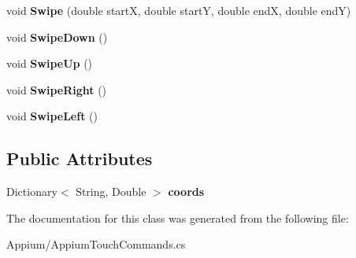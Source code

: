 \begin{DoxyCompactItemize}
\item 
\hypertarget{class_proto_test_1_1_golem_1_1_appium_1_1_appium_touch_commands_af433db53b97305c8228e1ce954869a0b}{void {\bfseries Swipe} (double start\-X, double start\-Y, double end\-X, double end\-Y)}\label{class_proto_test_1_1_golem_1_1_appium_1_1_appium_touch_commands_af433db53b97305c8228e1ce954869a0b}

\item 
\hypertarget{class_proto_test_1_1_golem_1_1_appium_1_1_appium_touch_commands_a748084cceb4117de257a71d1542d2eb1}{void {\bfseries Swipe\-Down} ()}\label{class_proto_test_1_1_golem_1_1_appium_1_1_appium_touch_commands_a748084cceb4117de257a71d1542d2eb1}

\item 
\hypertarget{class_proto_test_1_1_golem_1_1_appium_1_1_appium_touch_commands_af7cee2e3d005ea1cf9c3ba0f4e397775}{void {\bfseries Swipe\-Up} ()}\label{class_proto_test_1_1_golem_1_1_appium_1_1_appium_touch_commands_af7cee2e3d005ea1cf9c3ba0f4e397775}

\item 
\hypertarget{class_proto_test_1_1_golem_1_1_appium_1_1_appium_touch_commands_a13d30ccee6825d9a155abf67ef631f80}{void {\bfseries Swipe\-Right} ()}\label{class_proto_test_1_1_golem_1_1_appium_1_1_appium_touch_commands_a13d30ccee6825d9a155abf67ef631f80}

\item 
\hypertarget{class_proto_test_1_1_golem_1_1_appium_1_1_appium_touch_commands_af7a2166bc25e558d9cdb680d5b14e1ad}{void {\bfseries Swipe\-Left} ()}\label{class_proto_test_1_1_golem_1_1_appium_1_1_appium_touch_commands_af7a2166bc25e558d9cdb680d5b14e1ad}

\end{DoxyCompactItemize}
\subsection*{Public Attributes}
\begin{DoxyCompactItemize}
\item 
\hypertarget{class_proto_test_1_1_golem_1_1_appium_1_1_appium_touch_commands_a61339362c2dccf7f27fa64d2d357ece9}{Dictionary$<$ String, Double $>$ {\bfseries coords}}\label{class_proto_test_1_1_golem_1_1_appium_1_1_appium_touch_commands_a61339362c2dccf7f27fa64d2d357ece9}

\end{DoxyCompactItemize}


The documentation for this class was generated from the following file\-:\begin{DoxyCompactItemize}
\item 
Appium/Appium\-Touch\-Commands.\-cs\end{DoxyCompactItemize}
